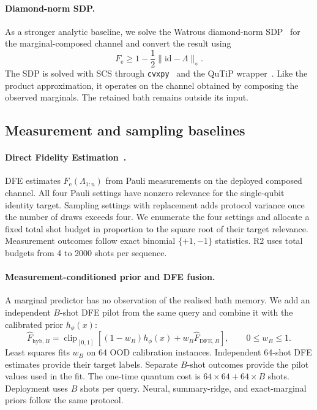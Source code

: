 \documentclass[12pt]{iopart}
\providecommand{\tfrac}[2]{\frac{#1}{#2}}
\newcommand{\Fe}{F_{\mathrm{e}}}
\newcommand{\Lset}{\Lambda}
\newcommand{\dfe}{\textsc{DFE}}
\begin{document}
\paragraph*{Diamond-norm SDP.}
As a stronger analytic baseline, we solve the Watrous diamond-norm SDP~\cite{watrous_dnorm_sdp} for the marginal-composed channel and convert the result using
\[
\Fe \geq 1-\tfrac{1}{2}\|\mathrm{id}-\Lset\|_{\diamond}.
\]
The SDP is solved with SCS through \texttt{cvxpy}~\cite{cvxpy} and the QuTiP wrapper~\cite{qutip}. Like the product approximation, it operates on the channel obtained by composing the observed marginals. The retained bath remains outside its input.

\subsection{Measurement and sampling baselines}

\paragraph*{Direct Fidelity Estimation~\cite{flammia_liu_2011}.}
\dfe{} estimates $\Fe(\Lset_{1:n})$ from Pauli measurements on the deployed composed channel. All four Pauli settings have nonzero relevance for the single-qubit identity target. Sampling settings with replacement adds protocol variance once the number of draws exceeds four. We enumerate the four settings and allocate a fixed total shot budget in proportion to the square root of their target relevance. Measurement outcomes follow exact binomial $\{+1,-1\}$ statistics. R2 uses total budgets from 4 to 2000 shots per sequence.

\paragraph*{Measurement-conditioned prior and DFE fusion.}
A marginal predictor has no observation of the realised bath memory. We add an independent $B$-shot DFE pilot from the same query and combine it with the calibrated prior $h_{\phi}(x)$:
\begin{equation}
\widehat F_{\mathrm{hyb},B}=\mathop{\mathrm{clip}}_{[0,1]}
\left[(1-w_B)h_{\phi}(x)+w_B\widehat F_{\mathrm{DFE},B}\right],
\qquad 0\leq w_B\leq1.
\label{eq:hybrid}
\end{equation}
Least squares fits $w_B$ on 64 OOD calibration instances. Independent 64-shot DFE estimates provide their target labels. Separate $B$-shot outcomes provide the pilot values used in the fit. The one-time quantum cost is $64\times64+64\times B$ shots. Deployment uses $B$ shots per query. Neural, summary-ridge, and exact-marginal priors follow the same protocol.
\end{document}
